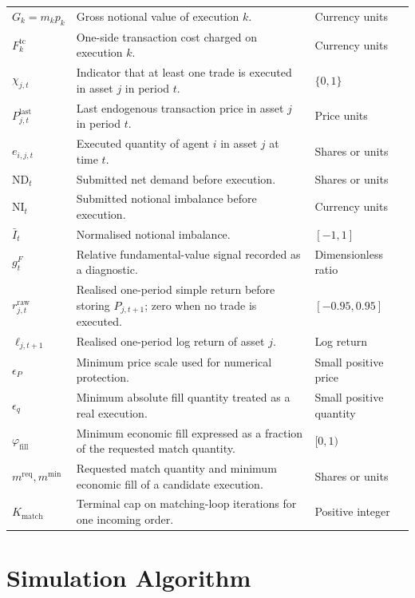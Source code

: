 \documentclass[12pt, a4paper]{article}
\begin{document}
\begin{longtable}{@{}L{0.22\textwidth}L{0.50\textwidth}L{0.20\textwidth}@{}}
        \(G_k=m_kp_k\) & Gross notional value of execution \(k\). & Currency units \\
        \(F_k^{\mathrm{tc}}\) & One-side transaction cost charged on execution \(k\). & Currency units \\
        \(\chi_{j,t}\) & Indicator that at least one trade is executed in asset \(j\) in period \(t\). & \(\{0,1\}\) \\
        \(P_{j,t}^{\text{last}}\) & Last endogenous transaction price in asset \(j\) in period \(t\). & Price units \\
        \(e_{i,j,t}\) & Executed quantity of agent \(i\) in asset \(j\) at time \(t\). & Shares or units \\
        \(\mathrm{ND}_t\) & Submitted net demand before execution. & Shares or units \\
        \(\mathrm{NI}_t\) & Submitted notional imbalance before execution. & Currency units \\
        \(\bar I_t\) & Normalised notional imbalance. & \([-1,1]\) \\
        \(g_t^F\) & Relative fundamental-value signal recorded as a diagnostic. & Dimensionless ratio \\
        \(r_{j,t}^{\mathrm{raw}}\) & Realised one-period simple return before storing \(P_{j,t+1}\); zero when no trade is executed. & \([-0.95,0.95]\) \\
        \(\ell_{j,t+1}\) & Realised one-period log return of asset \(j\). & Log return \\
        \(\epsilon_P\) & Minimum price scale used for numerical protection. & Small positive price \\
        \(\epsilon_q\) & Minimum absolute fill quantity treated as a real execution. & Small positive quantity \\
        \(\varphi_{\mathrm{fill}}\) & Minimum economic fill expressed as a fraction of the requested match quantity. & \([0,1)\) \\
        \(m^{\mathrm{req}},m^{\min}\) & Requested match quantity and minimum economic fill of a candidate execution. & Shares or units \\
        \(K_{\mathrm{match}}\) & Terminal cap on matching-loop iterations for one incoming order. & Positive integer \\
        \bottomrule
    \end{longtable}

    \section{Simulation Algorithm}\label{sec:simulation_algorithm}
\end{document}
